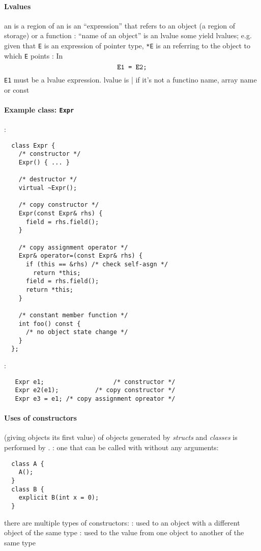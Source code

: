 \documentclass{memo}
\begin{document}
\paragraph{Lvalues}
\bit
\w an  is a region of 
\w an  is an ``expression'' that refers to an object (a region of
storage) or a function
\w {}: ``name of an object'' is an lvalue
\w some  yield lvalues; e.g. given that \verb+E+ is an
expression of pointer type, \verb+*E+ is an  referring
to the object to which \verb+E+ points
\w {}: In
  \[ \txt{\tt E1 = E2;} \]
\verb+E1+ must be a lvalue expression.
\w lvalue is | if it's not a functino name, array name or const
  
\eit

\paragraph{Example class: {\tt Expr}}
\bit
\w {}:
\begin{verbatim}
  class Expr {
    /* constructor */
    Expr() { ... }

    /* destructor */
    virtual ~Expr();

    /* copy constructor */
    Expr(const Expr& rhs) {
      field = rhs.field();
    }

    /* copy assignment operator */
    Expr& operator=(const Expr& rhs) {
      if (this == &rhs) /* check self-asgn */
        return *this;
      field = rhs.field();
      return *this;
    }

    /* constant member function */
    int foo() const { 
      /* no object state change */ 
    }
  };
\end{verbatim}
\w {}:
\begin{verbatim}
   Expr e1;                   /* constructor */
   Expr e2(e1);          /* copy constructor */
   Expr e3 = e1; /* copy assignment opreator */
\end{verbatim}
\eit

\paragraph{Uses of constructors}
\bit
\w {} (giving objects its first value) of objects generated
by {\em structs} and {\em classes} is performed by
. 
\w {}: one that can be called with without any
arguments:
  \begin{verbatim}
  class A {
    A();
  }
  class B {
    explicit B(int x = 0);
  }
  \end{verbatim}
\w there are multiple types of constructors:
\w {}: used to  an object with
a different object of the same type
\w {}:  used to  the value from one object
to another of the same type
\eit
\end{document}
